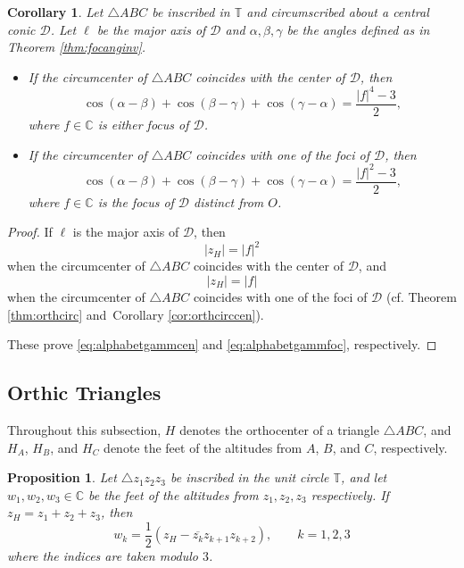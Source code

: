 \documentclass[11pt,reqno]{amsart}
\newtheorem{proposition}{Proposition}[section]
\newtheorem{corollary}{Corollary}[section]
\theoremstyle{definition}
\numberwithin{equation}{section}
\begin{document}
\begin{corollary}
    Let $\triangle ABC$ be inscribed in $\mathbb T$ and circumscribed about a central conic $\mathcal D$. Let $\ell$ be the major axis of $\mathcal D$ and $\alpha,\beta,\gamma$ be the angles defined as in Theorem \ref{thm:focanginv}. 
\begin{itemize}
    \item[(a)] If the circumcenter of $\triangle ABC$ coincides with the center of $\mathcal D$, then
\begin{equation}\label{eq:alphabetgammcen}
    \cos(\alpha-\beta)+\cos(\beta-\gamma)+\cos(\gamma-\alpha)
=
\frac{|f|^4-3}{2},
\end{equation}
where $f \in \mathbb C$ is either focus of $\mathcal D$.
\item[(b)] If the circumcenter of $\triangle ABC$ coincides with one of the foci of $\mathcal D$, then
\begin{equation}\label{eq:alphabetgammfoc}
    \cos(\alpha-\beta)+\cos(\beta-\gamma)+\cos(\gamma-\alpha)
=
\frac{|f|^2-3}{2},
\end{equation} 
where $f \in \mathbb C$ is the focus of $\mathcal D$ distinct from $O$.
\end{itemize}
\end{corollary}
\begin{proof}
If $\ell$ is the major axis of $\mathcal D$, then  
\[
|z_H|=|f|^2
\]
when the circumcenter of $\triangle ABC$ coincides with the center of $\mathcal D$, and
\[
|z_H|=|f|
\]
when the circumcenter of $\triangle ABC$ coincides with one of the foci of $\mathcal D$ (cf. Theorem \ref{thm:orthcirc} and \,Corollary \ref{cor:orthcirccen}). 

These prove \eqref{eq:alphabetgammcen} and \eqref{eq:alphabetgammfoc}, respectively.    
\end{proof}
\subsection{Orthic Triangles}\label{sec:orthictri}

Throughout this subsection, $H$ denotes the orthocenter of a triangle $\triangle ABC$, and
$H_A$, $H_B$, and $H_C$ denote the feet of the altitudes from $A$, $B$, and $C$, respectively.

\begin{proposition}\label{prop:orthiccoord}
Let $\triangle z_1z_2z_3$ be inscribed in the unit circle $\mathbb T$, and let $w_1,w_2,w_3\in \mathbb C$ be the feet of the altitudes from $z_1,z_2,z_3$ respectively. If $z_H=z_1+z_2+z_3$, then
\[
w_k
=
\frac12\left(z_H-\overline{z_k}z_{k+1}z_{k+2}\right), \qquad k=1,2,3
\]
where the indices are taken modulo $3$.
\end{proposition}
\end{document}
